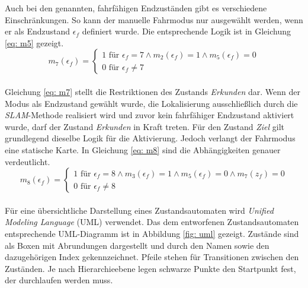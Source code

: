 		Auch bei den genannten, fahrfähigen Endzuständen gibt es verschiedene Einschränkungen. So kann der manuelle Fahrmodus nur ausgewählt werden, wenn er als Endzustand $\epsilon_f$ definiert wurde. Die entsprechende Logik ist in Gleichung \ref{eq: m5} gezeigt.\\
		
				\begin{equation}
					m_7(\epsilon_f)=\left\{\begin{array}{ll} 1 \text{ für } \epsilon_f=7 \wedge m_2(\epsilon_f)=1 \wedge m_5(\epsilon_f)=0 \\
						0 \text{ für }\epsilon_f\neq 7\end{array}\right.
					\label{eq: m7}
				\end{equation}\\
				
		Gleichung \ref{eq: m7} stellt die Restriktionen des Zustands \textit{Erkunden} dar. Wenn der Modus als Endzustand gewählt wurde, die Lokalisierung ausschließlich durch die \textit{SLAM}-Methode realisiert wird und zuvor kein fahrfähiger Endzustand aktiviert wurde, darf der Zustand \textit{Erkunden} in Kraft treten. Für den Zustand \textit{Ziel} gilt grundlegend dieselbe Logik für die Aktivierung. Jedoch verlangt der Fahrmodus eine statische Karte. In Gleichung \ref{eq: m8} sind die Abhängigkeiten genauer verdeutlicht.\\
		
		
				\begin{equation}
					m_8(\epsilon_f)=\left\{\begin{array}{ll} 1 \text{ für } \epsilon_f=8 \wedge m_3(\epsilon_f)=1 \wedge m_5(\epsilon_f)=0 \wedge m_7(z_f)=0 \\
						0 \text{ für }\epsilon_f\neq 8\end{array}\right.
					\label{eq: m8}
				\end{equation}\\
		
		Für eine übersichtliche Darstellung eines Zustandsautomaten wird \textit{Unified Modeling Language} (UML) verwendet. Das dem entworfenen Zustandsautomaten entsprechende UML-Diagramm ist in Abbildung \ref{fig: uml} gezeigt. Zustände sind als Boxen mit Abrundungen dargestellt und durch den Namen sowie den dazugehörigen Index gekennzeichnet. Pfeile stehen für Transitionen zwischen den Zuständen. Je nach Hierarchieebene legen schwarze Punkte den Startpunkt fest, der durchlaufen werden muss. 
		
	
	
